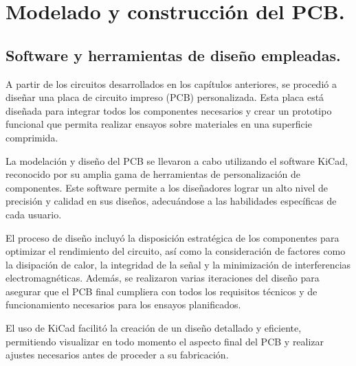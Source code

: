 \chapter{Modelado y construcción del PCB.}

\label{C:EModelado y construcción del PCB.}

\section{Software y herramientas de diseño empleadas.}

A partir de los circuitos desarrollados en los capítulos anteriores, se procedió a diseñar una placa de circuito impreso (PCB) personalizada. Esta placa está diseñada para integrar todos los componentes necesarios y crear un prototipo funcional que permita realizar ensayos sobre materiales en una superficie comprimida. \par 
La modelación y diseño del PCB se llevaron a cabo utilizando el software KiCad, reconocido por su amplia gama de herramientas de personalización de componentes. Este software permite a los diseñadores lograr un alto nivel de precisión y calidad en sus diseños, adecuándose a las habilidades específicas de cada usuario.\cite{kicad} \par 
El proceso de diseño incluyó la disposición estratégica de los componentes para optimizar el rendimiento del circuito, así como la consideración de factores como la disipación de calor, la integridad de la señal y la minimización de interferencias electromagnéticas. Además, se realizaron varias iteraciones del diseño para asegurar que el PCB final cumpliera con todos los requisitos técnicos y de funcionamiento necesarios para los ensayos planificados. \par 
El uso de KiCad facilitó la creación de un diseño detallado y eficiente, permitiendo visualizar en todo momento el aspecto final del PCB y realizar ajustes necesarios antes de proceder a su fabricación.\par

